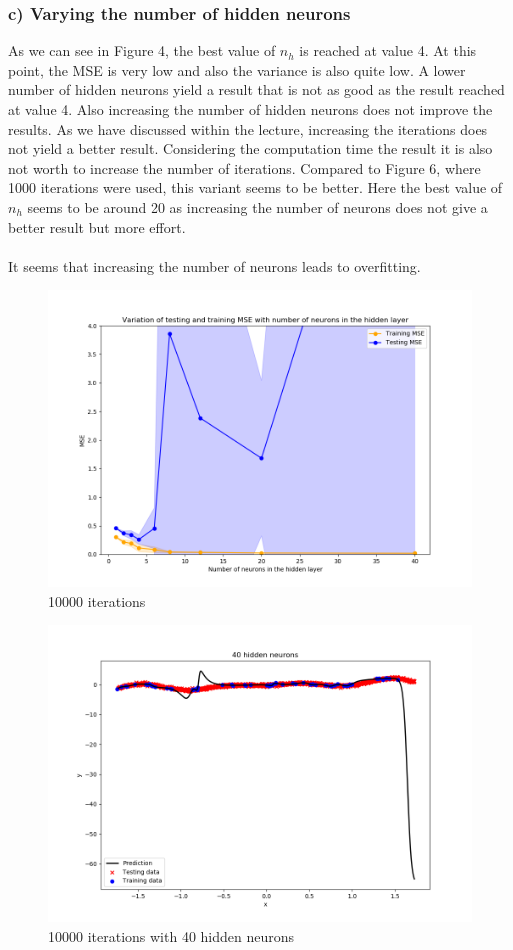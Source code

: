 \subsubsection*{c) Varying the number of hidden neurons}
As we can see in Figure 4, the best value of $n_h$ is reached at value 4. At this point, the MSE is very low and also the variance is also quite low. A lower number of hidden neurons yield a result that is not as good as the result reached at value 4. Also increasing the number of hidden neurons does not improve the results. As we have discussed within the lecture, increasing the iterations does not yield a better result. Considering the computation time the result it is also not worth to increase the number of iterations. Compared to Figure 6, where 1000 iterations were used, this variant seems to be better. Here the best value of $n_h$ seems to be around 20 as increasing the number of neurons does not give a better result but more effort.\\\\
It seems that increasing the number of neurons leads to overfitting.
\begin{figure}[!htbp]
	\centering
        \includegraphics[width=14cm]{1_1_c_1}
	\caption{10000 iterations}
\end{figure}

\begin{figure}[!htbp]
	\centering
        \includegraphics[width=14cm]{1_1_c_2}
	\caption{10000 iterations with 40 hidden neurons}
\end{figure}


